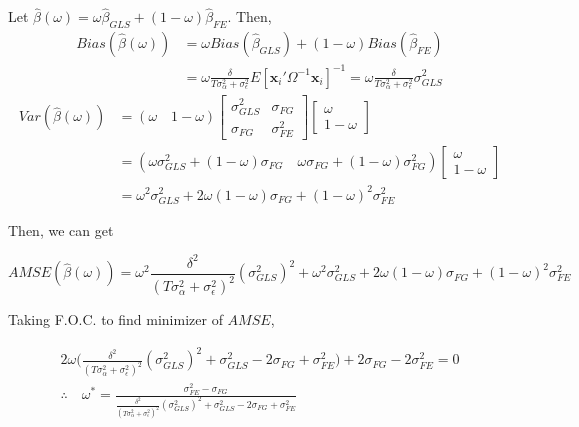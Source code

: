 \documentclass[12pt]{article}
\begin{document}
Let $\widehat{\beta}(\omega) = \omega\widehat{\beta}_{GLS} + (1-\omega)\widehat{\beta}_{FE}$. Then,
\begin{align*}
Bias(\widehat{\beta}(\omega)) &= \omega Bias(\widehat{\beta}_{GLS}) + (1-\omega) Bias(\widehat{\beta}_{FE})\\
&= \omega \frac{\delta}{T\sigma_\alpha^2 + \sigma_\epsilon^2} E[\mathbf{x}_i' \Omega^{-1} \mathbf{x}_i]^{-1} = \omega\frac{\delta}{T\sigma_\alpha^2 + \sigma_\epsilon^2} \sigma_{GLS}^2
\end{align*}
\begin{align*}
Var(\widehat{\beta}(\omega)) &= (\omega\quad 1-\omega) \begin{bmatrix}
\sigma_{GLS}^2 & \sigma_{FG}\\
\sigma_{FG} & \sigma_{FE}^2
\end{bmatrix} \begin{bmatrix}
\omega\\
1-\omega
\end{bmatrix} \\
&= ( \omega \sigma_{GLS}^2 + (1-\omega)\sigma_{FG} \quad \omega\sigma_{FG} + (1-\omega)\sigma_{FG}^2) \begin{bmatrix}
\omega\\
1-\omega
\end{bmatrix} \\
&= \omega^2 \sigma_{GLS}^2 + 2\omega(1-\omega) \sigma_{FG} + (1-\omega)^2 \sigma_{FE}^2
\end{align*}
 
Then, we can get 

\[
AMSE(\widehat{\beta}(\omega)) = \omega^2 \frac{\delta^2}{(T\sigma_\alpha^2 + \sigma_\epsilon^2)^2} (\sigma_{GLS}^2)^2 + \omega^2 \sigma_{GLS}^2 + 2\omega(1-\omega) \sigma_{FG} + (1-\omega)^2 \sigma_{FE}^2
\] 

Taking F.O.C. to find minimizer of $AMSE$, 

\begin{align*}
2\omega \bigg( \frac{\delta^2}{(T\sigma_\alpha^2+\sigma_\epsilon^2)^2} (\sigma_{GLS}^2)^2 + \sigma_{GLS}^2 - 2\sigma_{FG} +\sigma_{FE}^2 \bigg ) + 2\sigma_{FG} - 2\sigma_{FE}^2 =0\\
\therefore \quad \omega^{*} = \frac{\sigma_{FE}^2-\sigma_{FG}}{\frac{\delta^2}{(T\sigma_\alpha^2+\sigma_\epsilon^2)^2} (\sigma_{GLS}^2)^2 + \sigma_{GLS}^2 - 2\sigma_{FG} +\sigma_{FE}^2}\\
\end{align*}
\end{document}
